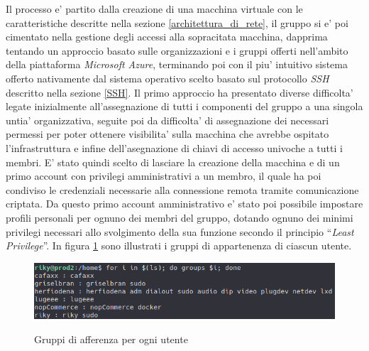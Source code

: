 \documentclass[a4paper]{report}
\newcommand{\quotes}[1]{``#1''}
\begin{document}
		Il processo e' partito dalla creazione di una macchina virtuale con le caratteristiche descritte nella sezione
		\ref{architettura_di_rete}, il gruppo si e' poi cimentato nella gestione degli accessi alla sopracitata
		macchina, dapprima tentando un approccio basato sulle organizzazioni e i gruppi offerti nell'ambito della
		piattaforma \emph{Microsoft Azure}, terminando poi con il piu' intuitivo sistema offerto nativamente dal sistema
		operativo scelto basato sul protocollo \emph{SSH} descritto nella sezione \ref{SSH}.
		Il primo approccio ha presentato diverse difficolta' legate inizialmente all'assegnazione di tutti i componenti
		del gruppo a una singola untia' organizzativa, seguite poi da difficolta' di assegnazione dei necessari permessi
		per poter ottenere visibilita' sulla macchina che avrebbe ospitato l'infrastruttura e infine dell'asegnazione di
		chiavi di accesso univoche a tutti i membri. E' stato quindi scelto di lasciare la creazione della macchina e di
		un primo account con privilegi amministrativi a un membro, il quale ha poi condiviso le credenziali necessarie
		alla connessione remota tramite comunicazione criptata. Da questo primo account amministrativo e' stato poi
		possibile impostare profili personali per ognuno dei membri del gruppo, dotando ognuno dei minimi privilegi
		necessari allo svolgimento della sua funzione secondo il principio \quotes{\emph{Least Privilege}}. In figura
		\ref{fig:utenti_e_gruppi} sono illustrati i gruppi di appartenenza di ciascun utente.

		\begin{figure}[H]
			\includegraphics[width=\textwidth]{UtentiEGruppi.png}\label{fig:utenti_e_gruppi}
			\caption \\Gruppi di afferenza per ogni utente
		\end{figure}
\end{document}
